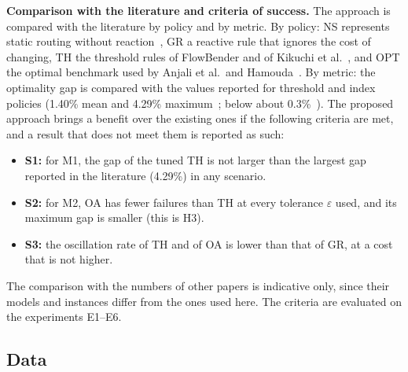 \documentclass{amsart}
\begin{document}
\textbf{Comparison with the literature and criteria of success.} The approach is compared with the literature by policy and by metric. By policy: NS represents static routing without reaction~\cite{hopps2000}, GR a reactive rule that ignores the cost of changing, TH the threshold rules of FlowBender and of Kikuchi et al.~\cite{kabbani2014,kikuchi2025}, and OPT the optimal benchmark used by Anjali et al.\ and Hamouda~\cite{anjali2002,hamouda2020}. By metric: the optimality gap is compared with the values reported for threshold and index policies (1.40\% mean and 4.29\% maximum~\cite{hamouda2020}; below about 0.3\%~\cite{ninomora2008}). The proposed approach brings a benefit over the existing ones if the following criteria are met, and a result that does not meet them is reported as such:
\begin{itemize}
  \item \textbf{S1:} for M1, the gap of the tuned TH is not larger than the largest gap reported in the literature (4.29\%) in any scenario.
  \item \textbf{S2:} for M2, OA has fewer failures than TH at every tolerance $\varepsilon$ used, and its maximum gap is smaller (this is H3).
  \item \textbf{S3:} the oscillation rate of TH and of OA is lower than that of GR, at a cost that is not higher.
\end{itemize}
The comparison with the numbers of other papers is indicative only, since their models and instances differ from the ones used here. The criteria are evaluated on the experiments E1--E6.

\subsection{Data}
\end{document}

